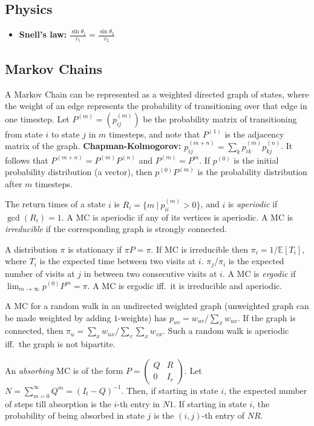   \subsection{Physics}
    \begin{itemize}
      \item \textbf{Snell's law:} $\frac{\sin\theta_1}{v_1} = \frac{\sin\theta_2}{v_2}$
    \end{itemize}

  \subsection{Markov Chains}
    A Markov Chain can be represented as a weighted directed graph of
    states, where the weight of an edge represents the probability of
    transitioning over that edge in one timestep. Let $P^{(m)} = (p^{(m)}_{ij})$
    be the probability matrix of transitioning from state $i$ to state $j$
    in $m$ timesteps, and note that $P^{(1)}$ is the adjacency matrix of
    the graph. \textbf{Chapman-Kolmogorov:} $p^{(m+n)}_{ij} = \sum_{k}
    p^{(m)}_{ik} p^{(n)}_{kj}$. It follows that $P^{(m+n)} =
    P^{(m)}P^{(n)}$ and $P^{(m)} = P^m$. If $p^{(0)}$ is the initial
    probability distribution (a vector), then $p^{(0)}P^{(m)}$ is the
    probability distribution after $m$ timesteps.

    The return times of a state $i$ is $R_i = \{m\ |\ p^{(m)}_{ii} > 0 \}$,
    and $i$ is \textit{aperiodic} if $\gcd(R_i) = 1$. A MC is aperiodic if
    any of its vertices is aperiodic. A MC is \textit{irreducible} if the
    corresponding graph is strongly connected.

    A distribution $\pi$ is stationary if $\pi P = \pi$. If MC is
    irreducible then $\pi_i = 1/\mathbb{E}[T_i]$, where $T_i$ is the
    expected time between two visits at $i$. $\pi_j/\pi_i$ is the expected
    number of visits at $j$ in between two consecutive visits at $i$. A MC
    is \textit{ergodic} if $\lim_{m\to\infty} p^{(0)} P^{m} = \pi$. A MC is
    ergodic iff.\ it is irreducible and aperiodic.

    A MC for a random walk in an undirected weighted graph (unweighted
    graph can be made weighted by adding $1$-weights) has $p_{uv} =
    w_{uv}/\sum_{x} w_{ux}$. If the graph is connected, then $\pi_u =
    \sum_{x} w_{ux} / \sum_{v}\sum_{x} w_{vx}$. Such a random walk is
    aperiodic iff.\ the graph is not bipartite.

    An \textit{absorbing} MC is of the form $P = \left(\begin{matrix} Q & R
    \\ 0 & I_r \end{matrix}\right)$. Let $N = \sum_{m=0}^\infty Q^m = (I_t
    - Q)^{-1}$. Then, if starting in state $i$, the expected number of
    steps till absorption is the $i$-th entry in $N1$. If starting in state
    $i$, the probability of being absorbed in state $j$ is the $(i,j)$-th
    entry of $NR$.

